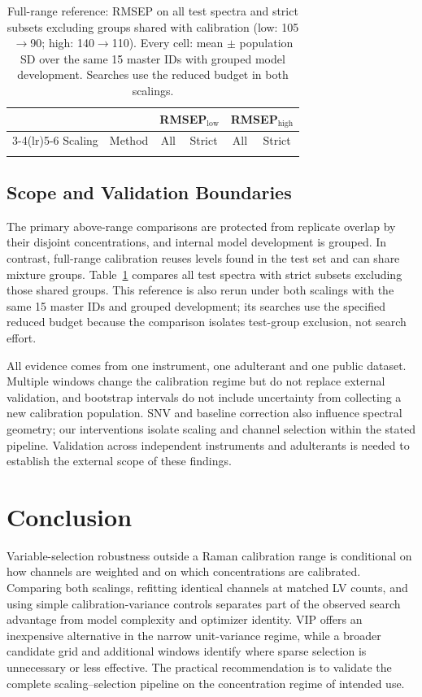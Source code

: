 \begin{table}[!t]
\caption{Full-range reference: RMSEP on all test spectra and strict subsets excluding groups shared with calibration (low: 105$\rightarrow$90; high: 140$\rightarrow$110). Every cell: mean $\pm$ population SD over the same 15 master IDs with grouped model development. Searches use the reduced budget in both scalings.}
\label{tab:leak}
\centering\footnotesize
\begin{tabular}{@{}llcccc@{}}
\toprule
 & & \multicolumn{2}{c}{RMSEP$_{\mathrm{low}}$} & \multicolumn{2}{c}{RMSEP$_{\mathrm{high}}$}\\
\cmidrule(lr){3-4}\cmidrule(lr){5-6}
Scaling & Method & All & Strict & All & Strict\\
\midrule
\\
\bottomrule
\end{tabular}
\end{table}

\subsection{Scope and Validation Boundaries}
The primary above-range comparisons are protected from replicate overlap by their disjoint concentrations, and internal model development is grouped. In contrast, full-range calibration reuses levels found in the test set and can share mixture groups. Table~\ref{tab:leak} compares all test spectra with strict subsets excluding those shared groups. This reference is also rerun under both scalings with the same 15 master IDs and grouped development; its searches use the specified reduced budget because the comparison isolates test-group exclusion, not search effort.

All evidence comes from one instrument, one adulterant and one public dataset. Multiple windows change the calibration regime but do not replace external validation, and bootstrap intervals do not include uncertainty from collecting a new calibration population. SNV and baseline correction also influence spectral geometry; our interventions isolate scaling and channel selection within the stated pipeline. Validation across independent instruments and adulterants is needed to establish the external scope of these findings.

\FloatBarrier
\clearpage
{}
\section{Conclusion}
Variable-selection robustness outside a Raman calibration range is conditional on how channels are weighted and on which concentrations are calibrated. Comparing both scalings, refitting identical channels at matched LV counts, and using simple calibration-variance controls separates part of the observed search advantage from model complexity and optimizer identity. VIP offers an inexpensive alternative in the narrow unit-variance regime, while a broader candidate grid and additional windows identify where sparse selection is unnecessary or less effective. The practical recommendation is to validate the complete scaling--selection pipeline on the concentration regime of intended use.

